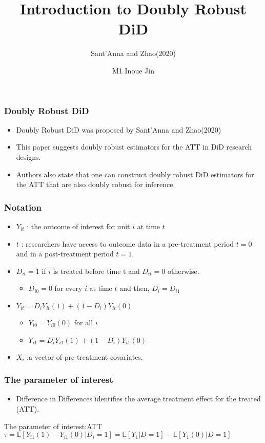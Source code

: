 \documentclass{beamer}
\title{Introduction to Doubly Robust DiD}
\subtitle{Sant'Anna and Zhao(2020)}
\author{M1 Inoue Jin}
\institute{Hitotsubashi University}
\begin{document}
\setlength{\abovedisplayskip}{3pt}
\setlength{\belowdisplayskip}{3pt}

\begin{frame}\frametitle{}
    \titlepage
\end{frame}

\begin{frame}\frametitle{Doubly Robust DiD}
    \begin{itemize}
        \item Doubly Robust DiD was proposed by Sant'Anna and Zhao(2020)
        \item This paper suggests doubly robust estimators for the ATT in DiD research designs.
        \item Authors also state that one can construct doubly robust DiD estimators for the ATT that are also doubly robust for inference.
    \end{itemize}
\end{frame}

\begin{frame}\frametitle{Notation}
    \begin{itemize}
        \item $Y_{it}$ : the outcome of interest for unit $i$ at time $t$
        \item $t$ : researchers have access to outcome data in a pre-treatment period $t = 0$ and in a post-treatment period $t = 1$.
        \item $D_{it} = 1$ if $i$ is treated before time t and $D_{it} = 0$ otherwise.
        \begin{itemize}
            \item $D_{i0} = 0$ for every $i$ at time $t$ and then, $D_{i} = D_{i1}$
        \end{itemize}
        \item $Y_{it} = D_{i}Y_{it}(1) + (1 - D_{i})Y_{it}(0)$
        \begin{itemize}
            \item $Y_{i0} = Y_{i0}(0)$ for all $i$ 
            \item $Y_{i1} = D_{i}Y_{i1}(1) + (1 - D_{i})Y_{i1}(0)$
        \end{itemize}
        \item $X_{i}$ :a vector of pre-treatment covariates.
    \end{itemize}
\end{frame}

\begin{frame}\frametitle{The parameter of interest}
    \begin{itemize}
        \item Difference in Differences identifies the average treatment effect for the treated (ATT). 
    \end{itemize}
    \begin{block}{The parameter of interest:ATT}
        $\tau = \mathbb{E}[Y_{i1}(1) - Y_{i1}(0)| D_{i} = 1] = \mathbb{E}[Y_{1} |D = 1] - \mathbb{E}[Y_{1}(0) | D = 1]$
    \end{block}
\end{frame}
\end{document}
